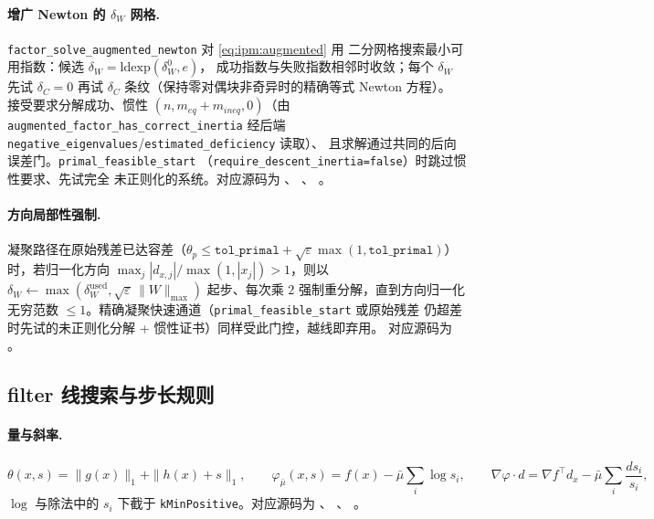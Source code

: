 \paragraph{增广 Newton 的 $\delta_W$ 网格.}
\texttt{factor\_solve\_augmented\_newton} 对 \eqref{eq:ipm:augmented} 用
二分网格搜索最小可用指数：候选 $\delta_W = \mathrm{ldexp}(\delta_W^{0}, e)$，
成功指数与失败指数相邻时收敛；每个 $\delta_W$ 先试 $\delta_C=0$ 再试
$\delta_C$ 条纹（保持零对偶块非奇异时的精确等式 Newton 方程）。
接受要求分解成功、惯性 $(n, m_{eq} + m_{ineq}, 0)$（由
\texttt{augmented\_factor\_has\_correct\_inertia} 经后端
\texttt{negative\_eigenvalues}/\texttt{estimated\_deficiency} 读取）、
且求解通过共同的后向误差门。\texttt{primal\_feasible\_start}
（\texttt{require\_descent\_inertia=false}）时跳过惯性要求、先试完全
未正则化的系统。对应源码为
、
、
。

\paragraph{方向局部性强制.}
凝聚路径在原始残差已达容差（$\theta_p \le \texttt{tol\_primal} +
\sqrt{\varepsilon}\max(1,\texttt{tol\_primal})$）时，若归一化方向
$\max_j |d_{x,j}| / \max(1, |x_j|) > 1$，则以
$\delta_W \leftarrow \max(\delta_W^{\text{used}}, \sqrt{\varepsilon}\,
\|W\|_{\max})$ 起步、每次乘 $2$ 强制重分解，直到方向归一化无穷范数
$\le 1$。精确凝聚快速通道（\texttt{primal\_feasible\_start} 或原始残差
仍超差时先试的未正则化分解 + 惯性证书）同样受此门控，越线即弃用。
对应源码为 。

\subsection{filter 线搜索与步长规则}
\label{subsec:engine-ipm-filter}

\paragraph{量与斜率.}
\begin{equation}
  \theta(x, s) = \|g(x)\|_1 + \|h(x) + s\|_1,\qquad
  \varphi_{\bar\mu}(x, s) = f(x) - \bar\mu \sum_i \log s_i,
  \qquad \nabla\varphi \cdot d = \nabla f^{\top} d_x -
  \bar\mu \sum_i \frac{d s_i}{s_i},
  \label{eq:ipm:theta-phi}
\end{equation}
$\log$ 与除法中的 $s_i$ 下截于 \texttt{kMinPositive}。对应源码为
、
、
。

